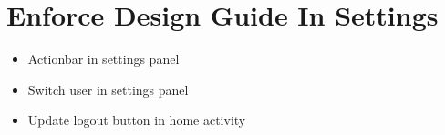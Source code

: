 \section{Enforce Design Guide In Settings}
\label{sec:enforce_design_guide_in_settings}


\begin{itemize}
	\item Actionbar in settings panel
	\item Switch user in settings panel
	\item Update logout button in home activity
\end{itemize}